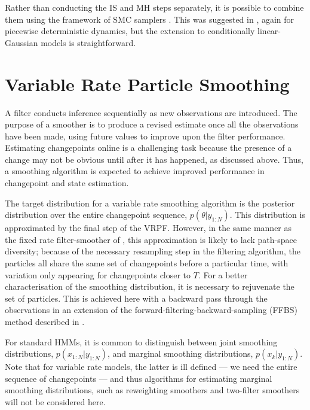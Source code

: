 \documentclass[peerreview,11pt,draftcls,onecolumn]{IEEEtran}
\begin{document}
Rather than conducting the IS and MH steps separately, it is possible to combine them using the framework of SMC samplers \cite{DelMoral2006}. This was suggested in \cite{Whiteley2011}, again for piecewise deterministic dynamics, but the extension to conditionally linear-Gaussian models is straightforward.



\section{Variable Rate Particle Smoothing} \label{sec:vrps}

A filter conducts inference sequentially as new observations are introduced. The purpose of a smoother is to produce a revised estimate once all the observations have been made, using future values to improve upon the filter performance. Estimating changepoints online is a challenging task because the presence of a change may not be obvious until after it has happened, as discussed above. Thus, a smoothing algorithm is expected to achieve improved performance in changepoint and state estimation.

The target distribution for a variable rate smoothing algorithm is the posterior distribution over the entire changepoint sequence, $p(\theta|y_{1:N})$. This distribution is approximated by the final step of the VRPF. However, in the same manner as the fixed rate filter-smoother of \cite{Kitagawa1996}, this approximation is likely to lack path-space diversity; because of the necessary resampling step in the filtering algorithm, the particles all share the same set of changepoints before a particular time, with variation only appearing for changepoints closer to $T$. For a better characterisation of the smoothing distribution, it is necessary to rejuvenate the set of particles. This is achieved here with a backward pass through the observations in an extension of the forward-filtering-backward-sampling (FFBS) method described in \cite{Godsill2004}.%

For standard HMMs, it is common to distinguish between joint smoothing distributions, $p(x_{1:N}|y_{1:N})$, and marginal smoothing distributions, $p(x_k|y_{1:N})$. Note that for variable rate models, the latter is ill defined --- we need the entire sequence of changepoints --- and thus algorithms for estimating marginal smoothing distributions, such as reweighting smoothers \cite{Doucet2000} and two-filter smoothers \cite{Briers2010,Fearnhead2010} will not be considered here.
\end{document}
